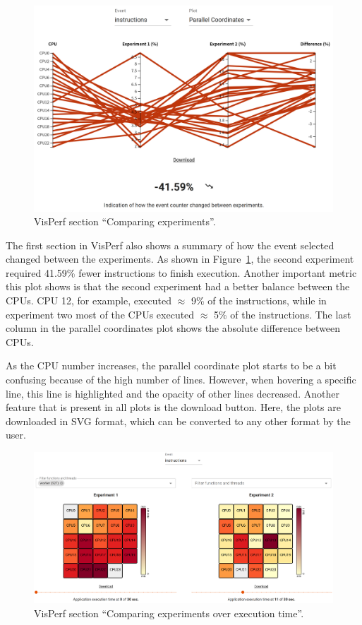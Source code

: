 \begin{figure}[ht]
    \centering
    \includegraphics[width=1.0\columnwidth]{../pictures/visperf-section-1.png}
    \caption{VisPerf section ``Comparing experiments''.}
    \label{figure:visperf-section-1}
\end{figure}

The first section in VisPerf also shows a summary of how the event selected changed between the experiments. As shown in Figure~\ref{figure:visperf-section-1}, the second experiment required 41.59\% fewer instructions to finish execution. Another important metric this plot shows is that the second experiment had a better balance between the CPUs. CPU 12, for example, executed $\approx$ 9\% of the instructions, while in experiment two most of the CPUs executed $\approx$ 5\% of the instructions. The last column in the parallel coordinates plot shows the absolute difference between CPUs.

As the CPU number increases, the parallel coordinate plot starts to be a bit confusing because of the high number of lines. However, when hovering a specific line, this line is highlighted and the opacity of other lines decreased. Another feature that is present in all plots is the download button. Here, the plots are downloaded in SVG format, which can be converted to any other format by the user.

\begin{figure}[ht]
    \centering
    \includegraphics[width=1.0\columnwidth]{../pictures/visperf-section-2.png}
    \caption{VisPerf section ``Comparing experiments over execution time''.}
    \label{figure:visperf-section-2}
\end{figure}

